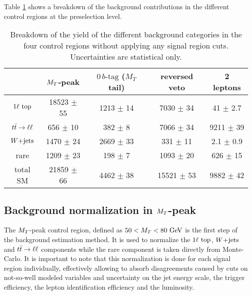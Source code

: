     Table \ref{tab:cutflowControlRegions} shows a breakdown of the background contributions
    in the different control regions at the preselection level.

\begin{table}[h!]
    \centering
\begin{tabular}{|c|cccc|}
    \hline
                     & $M_T$-peak       & $0\, b\text{-tag}$ ($M_T$ tail) & reversed veto    & 2 leptons             \\
    \hline
     $1\ell~\text{top}$ & 18523 $\pm$ 55   &  1213 $\pm$ 14        &  7030 $\pm$ 34   &   41 $\pm$ 2.7  \\
     $t\bar{t} \rightarrow \ell \ell$  &   656 $\pm$ 10   &   382 $\pm$ 8         &  7066 $\pm$ 34   & 9211 $\pm$ 39   \\
     $\text{$W$+jets}$        &  1470 $\pm$ 24   &  2669 $\pm$ 33        &   331 $\pm$ 11   &  2.1 $\pm$ 0.9  \\
     rare            &  1209 $\pm$ 23   &   198 $\pm$ 7         &  1093 $\pm$ 20   &  626 $\pm$ 15   \\
    \hline
     total SM        & 21859 $\pm$ 66   &  4462 $\pm$ 38        & 15521 $\pm$ 53   & 9882 $\pm$ 42   \\
    \hline
\end{tabular}
    \caption{Breakdown of the yield of the different background categories in the four
    control regions without applying any signal region cuts. Uncertainties are statistical only.}
    \label{tab:cutflowControlRegions}
\end{table}

        \subsection{Background normalization in $M_T$-peak \label{sec:MTpeakNormalization}}

    The $M_T$-peak control region, defined as $50 < M_T < 80 ~\text{GeV}$ is the first step of the
    background estimation method. It is used to normalize the $1\ell~\text{top}$, $\text{$W$+jets}$ and
    $t\bar{t} \rightarrow \ell \ell$ components while the rare component is taken directly from Monte-Carlo.
    It is important to note that this normalization is done for each signal region individually,
    effectively allowing to absorb disagreements caused by cuts on not-so-well modeled
    variables and uncertainty on the jet energy scale, the trigger efficiency, the lepton
    identification efficiency and the luminosity.

